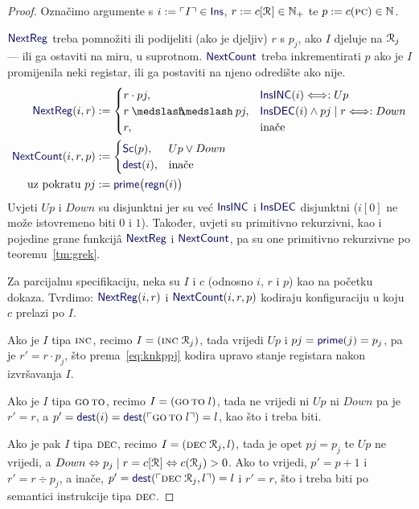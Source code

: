 \begin{proof}
	Označimo argumente s $i:=\kins{I}\in\f{Ins}$, $r:=c[\mathcal R_{}]\in{\mathbb N}_+$ te $p:=c(\textsc{pc})\in{\mathbb N}$.

$\f{NextReg}$ treba pomnožiti ili podijeliti (ako je djeljiv) $r$ s $p_j$, ako $I$ djeluje na $\mathcal R_{j}$ --- ili ga ostaviti na miru, u suprotnom. $\f{NextCount}$ treba inkrementirati $p$ ako je $I$ promijenila neki registar, ili ga postaviti na njeno odredište ako nije.
\begin{align}
    \label{eq:NextRegdef}\f{NextReg}(i,r)&:=\begin{cases}
	    r\cdot pj,&\f{InsINC}(i)\Longleftrightarrow:Up\\
	    r\div pj,&\f{InsDEC}(i)\land pj\mid r\Longleftrightarrow:Down\\
    r,&\text{inače}
    \end{cases}%
\\
    \f{NextCount}(i,r,p)&:=\begin{cases}
    \f{Sc}(p),&Up\lor Down\\
    \f{dest}(i),&\text{inače}
    \end{cases}%
\\
\text{uz pokratu }
pj&:=\f{prime}\bigl(\f{regn}(i)\bigr)%
\end{align}
Uvjeti $Up$ i $Down$ su disjunktni jer su već $\f{InsINC}$ i $\f{InsDEC}$ disjunktni ($i[0]$ ne može istovremeno biti $0$ i $1$). Također, uvjeti su primitivno rekurzivni, kao i pojedine grane funkcijâ $\f{NextReg}$ i $\f{NextCount}$, pa su one primitivno rekurzivne po teoremu~\ref{tm:grek}.

	Za parcijalnu specifikaciju, neka su $I$ i $c$ (odnosno $i$, $r$ i $p$) kao na početku dokaza. Tvrdimo: $\f{NextReg}(i,r)$ i $\f{NextCount}(i,r,p)$ kodiraju konfiguraciju u koju $c$ prelazi po $I$.

Ako je $I$ tipa $\textsc{inc}$, recimo $I=(\textsc{inc}\;\mathcal R_{j})$, tada vrijedi $Up$ i $pj=\f{prime}(j)=p_j$, pa je $r'=r\cdot p_j$, što prema~\eqref{eq:knkppj} kodira upravo stanje registara nakon izvršavanja $I$.

Ako je $I$ tipa $\textsc{go\,to}$, recimo $I=(\textsc{go\,to}\;l)$, tada ne vrijedi ni $Up$ ni $Down$ pa je $r'=r$, a $p'=\f{dest}(i)=\f{dest}(\kins{\goto\;l})=l$, kao što i treba biti.

	Ako je pak $I$ tipa $\textsc{dec}$, recimo $I=(\textsc{dec}\;\mathcal R_{j},l)$, tada je opet $pj=p_j$ te $Up$ ne vrijedi, a $Down\Leftrightarrow p_j\mid r=c[\mathcal R_{}]\Leftrightarrow c(\mathcal R_{j})>0$. Ako to vrijedi, $p'=p+1$ i $r'=r\div p_j$, a inače, $p'=\f{dest}(\kins{\decr jl})=l$ i $r'=r$, što i treba biti po semantici instrukcije tipa $\textsc{dec}$.
\end{proof}

